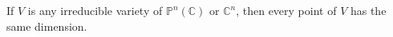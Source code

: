 If $V$ is any irreducible variety of $\mathbb{P}^n(\mathbb{C})$ or $\mathbb{C}^n$, then every point of $V$ has the same dimension.
